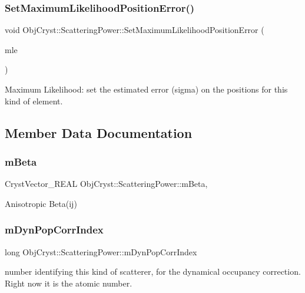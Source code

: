 \subsubsection{\texorpdfstring{SetMaximumLikelihoodPositionError()}{SetMaximumLikelihoodPositionError()}}
{\footnotesize\ttfamily void Obj\+Cryst\+::\+Scattering\+Power\+::\+Set\+Maximum\+Likelihood\+Position\+Error (\begin{DoxyParamCaption}\item[{const R\+E\+AL}]{mle }\end{DoxyParamCaption})}

Maximum Likelihood\+: set the estimated error (sigma) on the positions for this kind of element. 

\subsection{Member Data Documentation}
\mbox{\label{class_obj_cryst_1_1_scattering_power_a02a4524640e2d23805df26b114be680f}} 
\subsubsection{\texorpdfstring{mBeta}{mBeta}}
{\footnotesize\ttfamily Cryst\+Vector\+\_\+\+R\+E\+AL Obj\+Cryst\+::\+Scattering\+Power\+::m\+Beta\hspace{0.3cm}{\ttfamily [mutable]}, {\ttfamily [protected]}}

Anisotropic Beta(ij) \mbox{\label{class_obj_cryst_1_1_scattering_power_a0266da1d92ec3d14989a2d4047710c4b}} 
\subsubsection{\texorpdfstring{mDynPopCorrIndex}{mDynPopCorrIndex}}
{\footnotesize\ttfamily long Obj\+Cryst\+::\+Scattering\+Power\+::m\+Dyn\+Pop\+Corr\+Index\hspace{0.3cm}{\ttfamily [protected]}}

number identifying this kind of scatterer, for the dynamical occupancy correction. Right now it is the atomic number. \mbox{\label{class_obj_cryst_1_1_scattering_power_a030be52e5ba5540bf068e6be4ccb190e}} 
